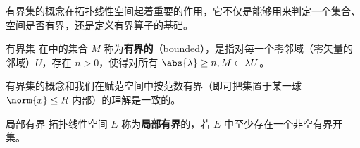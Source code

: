 
有界集的概念在拓扑线性空间起着重要的作用，它不仅是能够用来判定一个集合、空间是否有界，还是定义有界算子的基础。

\begin{definition}{有界集}
在中的集合 $M$ 称为\textbf{有界的}（bounded），是指对每一个零邻域（零矢量的邻域）$U$，存在 $n>0$，使得对所有 $\abs{\lambda}\geq n,M\subset \lambda U$。 
\end{definition}
有界集的概念和我们在赋范空间中按范数有界（即可把集置于某一球 $\norm{x}\leq R$ 内部）的理解是一致的。

\begin{definition}{局部有界}
拓扑线性空间 $E$ 称为\textbf{局部有界}的，若 $E$ 中至少存在一个非空有界开集。
\end{definition}



